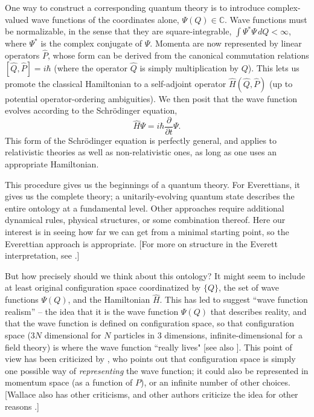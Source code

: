 \documentclass[12pt,english]{article}
\newcommand{\be}{\begin{equation}}
\newcommand{\ee}{\end{equation}}
\begin{document}
One way to construct a corresponding quantum theory is to introduce complex-valued wave functions of the coordinates alone, $\Psi(Q) \in \mathbb{C}$.
Wave functions must be normalizable, in the sense that they are square-integrable, $\int \Psi^*\Psi \,dQ <\infty$, where $\Psi^*$ is the complex conjugate of $\Psi$.
Momenta are now represented by linear operators $\hat{P}$, whose form can be derived from the canonical commutation relations $[\hat{Q},\hat{P}]=i\hbar$ (where the operator $\hat{Q}$ is simply multiplication by $Q$).
This lets us promote the classical Hamiltonian to a self-adjoint operator $\hat{H}(\hat{Q}, \hat{P})$ (up to potential operator-ordering ambiguities).
We then posit that the wave function evolves according to the Schr\"odinger equation,
\be
  \hat{H}\Psi = i\hbar \frac{\partial}{\partial t}\Psi.
\ee
This form of the Schr\"odinger equation is perfectly general, and applies to relativistic theories as well as non-relativistic ones, as long as one uses an appropriate Hamiltonian.

This procedure gives us the beginnings of a quantum theory.
For Everettians, it gives us the complete theory; a unitarily-evolving quantum state describes the entire ontology at a fundamental level.
Other approaches require additional dynamical rules, physical structures, or some combination thereof.
Here our interest is in seeing how far we can get from a minimal starting point, so the Everettian approach is appropriate.
[For more on structure in the Everett interpretation, see \citep{wallace2003everett,pittphilsci18772}.]

But how precisely should we think about this ontology?
It might seem to include at least original configuration space coordinatized by $\{Q\}$, the set of wave functions $\Psi(Q)$, and the Hamiltonian $\hat{H}$.
This has led \citet{albert1996} to suggest ``wave function realism'' -- the idea that it is the wave function $\Psi(Q)$ that describes reality, and that the wave function is defined on configuration space, so that configuration space  ($3N$ dimensional for $N$ particles in 3 dimensions, infinite-dimensional for a field theory) is where the wave function ``really lives" [see also \citep{ney2013,north2013}].
This point of view has been criticized by \citet{wallace2017}, who points out that configuration space is simply one possible way of \emph{representing} the wave function; it could also be represented in momentum space (as a function of $P$), or an infinite number of other choices.
[Wallace also has other criticisms, and other authors criticize the idea for other reasons \citep{allori2013,Myrvold:2015vly}.]
\end{document}

